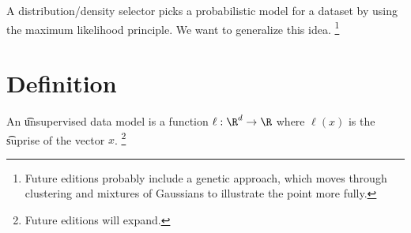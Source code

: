 
A distribution/density selector picks a probabilistic model for a dataset by using the maximum likelihood principle.
We want to generalize this idea.
  \ifhmode\unskip\fi\footnote{
Future editions probably include a genetic approach, which moves through clustering and mixtures of Gaussians to illustrate the point more fully.
  }

\section{Definition}

An \t{unsupervised data model} is a function $\ell: \R^d \to \R$ where $\ell(x)$ is the \t{suprise} of the vector $x$.
  \ifhmode\unskip\fi\footnote{
Future editions will expand.
  }

\blankpage

